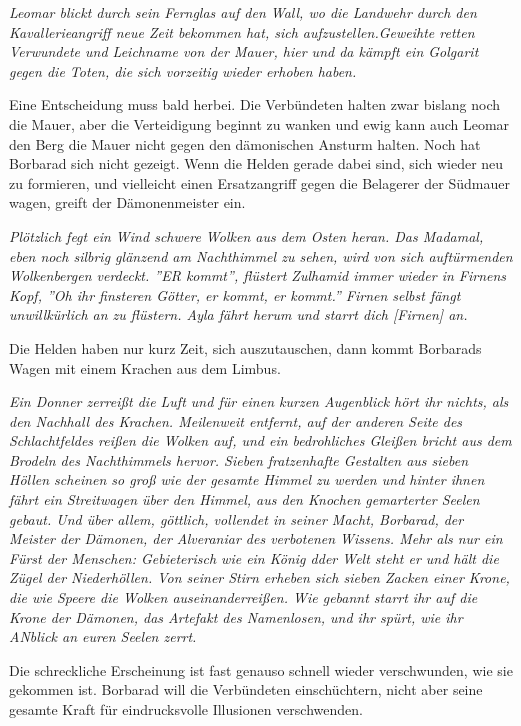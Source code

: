 \emph{Leomar blickt durch sein Fernglas auf den Wall, wo die Landwehr durch den Kavallerieangriff neue Zeit bekommen hat, sich aufzustellen.Geweihte retten Verwundete und Leichname von der Mauer, hier und da kämpft ein Golgarit gegen die Toten, die sich vorzeitig wieder erhoben haben.}

Eine Entscheidung muss bald herbei. Die Verbündeten halten zwar bislang noch die Mauer, aber die Verteidigung beginnt zu wanken und ewig kann auch Leomar den Berg die Mauer nicht gegen den dämonischen Ansturm halten. Noch hat Borbarad sich nicht gezeigt. Wenn die Helden gerade dabei sind, sich wieder neu zu formieren, und vielleicht einen Ersatzangriff gegen die Belagerer der Südmauer wagen, greift der Dämonenmeister ein.

\emph{Plötzlich fegt ein Wind schwere Wolken aus dem Osten heran. Das Madamal, eben noch silbrig glänzend am Nachthimmel zu sehen, wird von sich auftürmenden Wolkenbergen verdeckt. ''ER kommt'', flüstert Zulhamid immer wieder in Firnens Kopf, ''Oh ihr finsteren Götter, er kommt, er kommt.'' Firnen selbst fängt unwillkürlich an zu flüstern. Ayla fährt herum und starrt dich [Firnen] an.}

Die Helden haben nur kurz Zeit, sich auszutauschen, dann kommt Borbarads Wagen mit einem Krachen aus dem Limbus.

\emph{Ein Donner zerreißt die Luft und für einen kurzen Augenblick hört ihr nichts, als den Nachhall des Krachen. Meilenweit entfernt, auf der anderen Seite des Schlachtfeldes reißen die Wolken auf, und ein bedrohliches Gleißen bricht aus dem Brodeln des Nachthimmels hervor. Sieben fratzenhafte Gestalten aus sieben Höllen scheinen so groß wie der gesamte Himmel zu werden und hinter ihnen fährt ein Streitwagen über den Himmel, aus den Knochen gemarterter Seelen gebaut. Und über allem, göttlich, vollendet in seiner Macht, Borbarad, der Meister der Dämonen, der Alveraniar des verbotenen Wissens. Mehr als nur ein Fürst der Menschen: Gebieterisch wie ein König dder Welt steht er und hält die Zügel der Niederhöllen. Von seiner Stirn erheben sich sieben Zacken einer Krone, die wie Speere die Wolken auseinanderreißen. Wie gebannt starrt ihr auf die Krone der Dämonen, das Artefakt des Namenlosen, und ihr spürt, wie ihr ANblick an euren Seelen zerrt.}

Die schreckliche Erscheinung ist fast genauso schnell wieder verschwunden, wie sie gekommen ist. Borbarad will die Verbündeten einschüchtern, nicht aber seine gesamte Kraft für eindrucksvolle Illusionen verschwenden.

